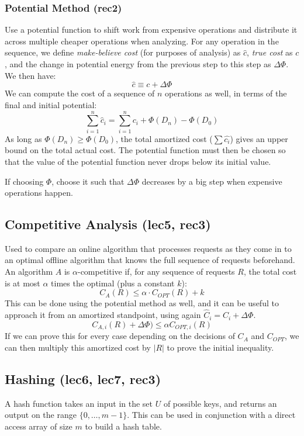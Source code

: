 \documentclass{article}
\begin{document}
\begin{multicols}{2}
\subsubsection{Potential Method (rec2)}
Use a potential function to shift work from expensive operations and distribute it across multiple cheaper operations when analyzing. For any operation in the sequence, we define \textit{make-believe cost} (for purposes of analysis) as $\hat{c}$, \textit{true cost} as $c$, and the change in potential energy from the previous step to this step as $\Delta\Phi$. We then have:
\[ \hat{c} \equiv c + \Delta\Phi \]
We can compute the cost of a sequence of $n$ operations as well, in terms of the final and initial potential:
\[ \sum_{i=1}^n \hat{c}_i = \sum_{i=1}^{n} c_i + \Phi(D_n) - \Phi(D_0) \]
As long as $\Phi(D_n) \geq \Phi(D_0)$, the total amortized cost ($\sum \hat{c_i}$) gives an upper bound on the total actual cost. The potential function must then be chosen so that the value of the potential function never drops below its initial value. 

If choosing $\Phi$, choose it such that $\Delta\Phi$ decreases by a big step when expensive operations happen.

\subsection{Competitive Analysis (lec5, rec3)}
Used to compare an online algorithm that processes requests as they come in to an optimal offline algorithm that knows the full sequence of requests beforehand. An algorithm $A$ is $\alpha$-competitive if, for any sequence of requests $R$, the total cost is at most $\alpha$ times the optimal (plus a constant $k$):
\[ C_A(R) \leq \alpha\cdot C_{OPT}(R) + k \]
This can be done using the potential method as well, and it can be useful to approach it from an amortized standpoint, using again $\hat{C}_i = C_i + \Delta\Phi$. 
\[ C_{A,i}(R) + \Delta\Phi) \leq \alpha C_{OPT,i}(R) \] 
If we can prove this for every case depending on the decisions of $C_A$ and $C_{OPT}$, we can then multiply this amortized cost by $|R|$ to prove the initial inequality. 

\subsection{Hashing (lec6, lec7, rec3)}
A hash function takes an input in the set $U$ of possible keys, and returns an output on the range $\{0,\ldots, m-1\}$. This can be used in conjunction with a direct access array of size $m$ to build a hash table.

\end{multicols}
\end{document}
